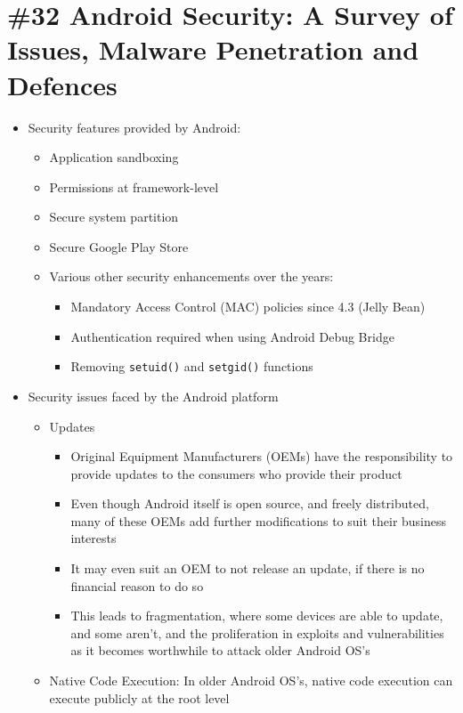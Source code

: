 \section{\#32 Android Security: A Survey of Issues, Malware Penetration and Defences}
\begin{itemize}
	\item Security features provided by Android:
	\begin{itemize}
		\item Application sandboxing
		\item Permissions at framework-level
		\item Secure system partition
		\item Secure Google Play Store
		\item Various other security enhancements over the years:
		\begin{itemize}
			\item Mandatory Access Control (MAC) policies since 4.3 (Jelly Bean)
			\item Authentication required when using Android Debug Bridge
			\item Removing \texttt{setuid()} and \texttt{setgid()} functions
		\end{itemize}
	\end{itemize}
	\item Security issues faced by the Android platform
	\begin{itemize}
		\item Updates
		\begin{itemize}
			\item Original Equipment Manufacturers (OEMs) have the responsibility to provide updates to the consumers who provide their product
			\item Even though Android itself is open source, and freely distributed, many of these OEMs add further modifications to suit their business interests
			\item It may even suit an OEM to not release an update, if there is no financial reason to do so
			\item This leads to fragmentation, where some devices are able to update, and some aren't, and the proliferation in exploits and vulnerabilities as it becomes worthwhile to attack older Android OS's
		\end{itemize}
		\item Native Code Execution: In older Android OS's, native code execution can execute publicly at the root level

\end{itemize}
\end{itemize}
